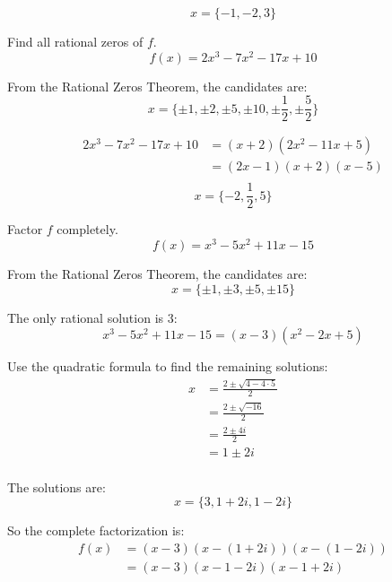 \documentclass[fleqn,addpoints]{exam}
\begin{document}
\begin{questions}
\begin{solution}
      \[
        \boxed{x = \{-1, -2, 3 \}}
      \]

    \end{solution}

    \question[10] Find all rational zeros of $f$.
    \[
      f(x) = 2x^3 - 7x^2 - 17x + 10
    \]

    \begin{solution}
      From the Rational Zeros Theorem, the candidates are: 
      \[
        x = \{\pm 1, \pm 2, \pm 5, \pm 10, \pm \frac{1}{2}, \pm \frac{5}{2}  \}
      \]

      \begin{align*}
        2x^3 - 7x^2 - 17x + 10 &= (x + 2) (2x^2 - 11x + 5) \\
                               &= (2x - 1) (x + 2) (x - 5) \\
      \end{align*}
      \[
        \boxed{x = \{-2, \frac{1}{2}, 5 \}}
      \]
    \end{solution}

    \ifprintanswers
      \pagebreak
    \fi

    \question[10] Factor $f$ completely.
    \[
      f(x) = x^3 - 5x^2 + 11x - 15
    \]

    \begin{solution}
      From the Rational Zeros Theorem, the candidates are: 
      \[
        x = \{\pm 1, \pm 3, \pm 5, \pm 15 \}
      \]

      The only rational solution is 3:
      \[
        x^3 - 5x^2 + 11x - 15 = (x - 3) (x^2 - 2x + 5) 
      \]

      Use the quadratic formula to find the remaining solutions:
      \begin{align*}
        x &= \frac{2 \pm \sqrt{4 - 4 \cdot 5}}{2} \\
          &= \frac{2 \pm \sqrt{-16}}{2} \\
          &= \frac{2 \pm 4i}{2} \\
          &= 1 \pm 2i \\
      \end{align*}
      
      The solutions are:
      \[
        x = \{ 3, 1 + 2i, 1 - 2i \}
      \]

      So the complete factorization is:
      \begin{align*}
        f(x) &= (x - 3)(x - (1 + 2i))(x - (1 - 2i)) \\
             &= \boxed{(x - 3)(x - 1 - 2i)(x - 1 + 2i)} \\
      \end{align*}


\end{solution}
\end{questions}
\end{document}
